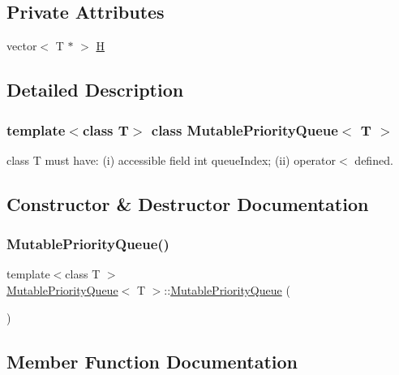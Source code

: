 \subsection*{Private Attributes}
\begin{DoxyCompactItemize}
\item 
vector$<$ T $\ast$ $>$ \mbox{\hyperlink{class_mutable_priority_queue_a2c442cb8e2ff5cfa7562174dadc83fe7}{H}}
\end{DoxyCompactItemize}


\subsection{Detailed Description}
\subsubsection*{template$<$class T$>$\newline
class Mutable\+Priority\+Queue$<$ T $>$}

class T must have\+: (i) accessible field int queue\+Index; (ii) operator$<$ defined. 

\subsection{Constructor \& Destructor Documentation}
\mbox{\label{class_mutable_priority_queue_aba8ebedcbe659f2680bac229cfaca526}} 
\subsubsection{\texorpdfstring{Mutable\+Priority\+Queue()}{MutablePriorityQueue()}}
{\footnotesize\ttfamily template$<$class T $>$ \\
\mbox{\hyperlink{class_mutable_priority_queue}{Mutable\+Priority\+Queue}}$<$ T $>$\+::\mbox{\hyperlink{class_mutable_priority_queue}{Mutable\+Priority\+Queue}} (\begin{DoxyParamCaption}{ }\end{DoxyParamCaption})}



\subsection{Member Function Documentation}
\mbox{\label{class_mutable_priority_queue_a0878839cc1d2dba2b8ab2e589ecc6405}} 
